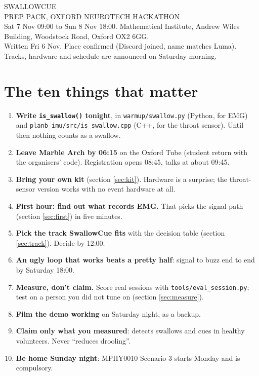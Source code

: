 \documentclass[10.5pt,a4paper]{article}
\newcommand{\f}[1]{\texttt{#1}}
\begin{document}
{\display\Huge SWALLOWCUE}\\[0.3ex]
{\display\Large PREP PACK, OXFORD NEUROTECH HACKATHON}\\[0.5ex]
Sat 7 Nov 09:00 to Sun 8 Nov 18:00. Mathematical Institute, Andrew Wiles Building, Woodstock Road, Oxford OX2 6GG.\\
Written Fri 6 Nov. Place confirmed (Discord joined, name matches Luma). Tracks, hardware and schedule are announced on Saturday morning.

\vspace{1ex}
\section*{The ten things that matter}
\begin{enumerate}[leftmargin=1.8em]
\item \textbf{Write \f{is\_swallow()} tonight}, in \f{warmup/swallow.py} (Python, for EMG) and \f{planb\_imu/src/is\_swallow.cpp} (C++, for the throat sensor). Until then nothing counts as a swallow.
\item \textbf{Leave Marble Arch by 06:15} on the Oxford Tube (student return with the organisers' code). Registration opens 08:45, talks at about 09:45.
\item \textbf{Bring your own kit} (section \ref{sec:kit}). Hardware is a surprise; the throat-sensor version works with no event hardware at all.
\item \textbf{First hour: find out what records EMG.} That picks the signal path (section \ref{sec:first}) in five minutes.
\item \textbf{Pick the track SwallowCue fits} with the decision table (section \ref{sec:track}). Decide by 12:00.
\item \textbf{An ugly loop that works beats a pretty half}: signal to buzz end to end by Saturday 18:00.
\item \textbf{Measure, don't claim.} Score real sessions with \f{tools/eval\_session.py}; test on a person you did not tune on (section \ref{sec:measure}).
\item \textbf{Film the demo working} on Saturday night, as a backup.
\item \textbf{Claim only what you measured}: detects swallows and cues in healthy volunteers. Never ``reduces drooling''.
\item \textbf{Be home Sunday night}: MPHY0010 Scenario 3 starts Monday and is compulsory.
\end{enumerate}
\end{document}
